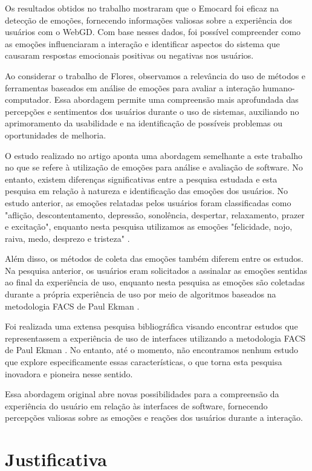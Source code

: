 Os resultados obtidos no trabalho mostraram que o Emocard foi eficaz na detecção de emoções, fornecendo informações valiosas sobre a experiência dos usuários com o WebGD. Com base nesses dados, foi possível compreender como as emoções influenciaram a interação e identificar aspectos do sistema que causaram respostas emocionais positivas ou negativas nos usuários.

Ao considerar o trabalho de Flores, observamos a relevância do uso de métodos e ferramentas baseados em análise de emoções para avaliar a interação humano-computador. Essa abordagem permite uma compreensão mais aprofundada das percepções e sentimentos dos usuários durante o uso de sistemas, auxiliando no aprimoramento da usabilidade e na identificação de possíveis problemas ou oportunidades de melhoria.

O estudo realizado no artigo aponta uma abordagem semelhante a este trabalho no que se refere à utilização de emoções para análise e avaliação de software. No entanto, existem diferenças significativas entre a pesquisa estudada e esta pesquisa em relação à natureza e identificação das emoções dos usuários. No estudo anterior, as emoções relatadas pelos usuários foram classificadas como "aflição, descontentamento, depressão, sonolência, despertar, relaxamento, prazer e excitação", enquanto nesta pesquisa utilizamos as emoções "felicidade, nojo, raiva, medo, desprezo e tristeza" \cite{4}.

Além disso, os métodos de coleta das emoções também diferem entre os estudos. Na pesquisa anterior, os usuários eram solicitados a assinalar as emoções sentidas ao final da experiência de uso, enquanto nesta pesquisa as emoções são coletadas durante a própria experiência de uso por meio de algoritmos baseados na metodologia FACS de Paul Ekman \cite{5}.

Foi realizada uma extensa pesquisa bibliográfica visando encontrar estudos que representassem a experiência de uso de interfaces utilizando a metodologia FACS de Paul Ekman \cite{5}. No entanto, até o momento, não encontramos nenhum estudo que explore especificamente essas características, o que torna esta pesquisa inovadora e pioneira nesse sentido.

Essa abordagem original abre novas possibilidades para a compreensão da experiência do usuário em relação às interfaces de software, fornecendo percepções valiosas sobre as emoções e reações dos usuários durante a interação.

\section{Justificativa}

